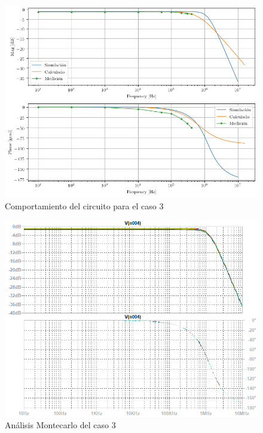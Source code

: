 \begin{figure}[H]
\begin{centering}
\includegraphics[scale=0.5]{../Ex1/ib/Resources1b/H3b}
\par\end{centering}
\caption{Comportamiento del circuito para el caso 3}
\end{figure}

\begin{figure}[H]
\begin{centering}
\includegraphics[scale=0.5]{../Ex1/ib/Resources1b/Montecarlo3}
\par\end{centering}
\caption{Análisis Montecarlo del caso 3}
\end{figure}

